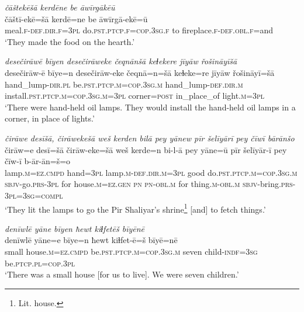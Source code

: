 \ea \label{ŽE.39}
\textit{čāštekēšā kerdēne be āwīrgākēū} \\ 
\gll čāštī-ekē=šā kerdē=ne be āwīrgā-ekē=ū \\ 
 meal\textsc{.f}\textsc{-def}\textsc{.dir}\textsc{.f}\textsc{=3pl} do\textsc{.pst}\textsc{.ptcp}\textsc{.f}\textsc{=cop}\textsc{.3sg}\textsc{.f} to fireplace\textsc{.f}\textsc{-def}\textsc{.obl}\textsc{.f}=and \\ 
\glt `They made the food on the hearth.'
\z 
 
\ea \label{ŽE.41}
\textit{desečirāwē bīyen desečirāweke čeqnānšā keɫekere jīyāw řošināyīšā} \\ 
\gll desečirāw-ē bīye=n desečirāw-eke čeqnā=n=šā keɫeke=re jīyāw řošināyī=šā \\ 
 hand\_lump\textsc{-dir}\textsc{.pl} be\textsc{.pst}\textsc{.ptcp}\textsc{.m}\textsc{=cop}\textsc{.3sg}\textsc{.m} hand\_lump\textsc{-def}\textsc{.dir}\textsc{.m} install\textsc{.pst}\textsc{.ptcp}\textsc{.m}\textsc{=cop}\textsc{.3sg}\textsc{.m}\textsc{=3pl} corner\textsc{=\textsc{post}} in\_place\_of light\textsc{.m}\textsc{=3pl} \\ 
\glt `There were hand-held oil lamps. They would install the hand-held oil lamps in a corner, in place of lights.'
\z 
 
\ea \label{ŽE.42}
\textit{čirāwe desīšā, čirāwekešā weš kerden bilā pey yānew pīr šelīyārī pey čīwī bārānšo} \\ 
\gll čirāw=e desī=šā čirāw-eke=šā weš kerde=n bi-l-ā pey yāne=ū pīr šelīyār-ī pey čīw-ī b-ār-ān=š=o \\ 
 lamp\textsc{.m}\textsc{=ez}\textsc{.cmpd} hand\textsc{=3pl} lamp\textsc{.m}\textsc{-def}\textsc{.dir}\textsc{.m}\textsc{=3pl} good do\textsc{.pst}\textsc{.ptcp}\textsc{.m}\textsc{=cop}\textsc{.3sg}\textsc{.m} \textsc{sbjv-}go\textsc{.prs}\textsc{-3pl} for house\textsc{.m}\textsc{\textsc{=ez.gen}} \textsc{pn} \textsc{pn}\textsc{-obl}\textsc{.m} for thing\textsc{.m}\textsc{-obl}\textsc{.m} \textsc{sbjv-}bring\textsc{.prs}\textsc{-3pl}\textsc{=3sg}\textsc{=compl} \\ 
\glt `They lit the lamps to go the Pir Shaliyar’s shrine\footnote{Lit. house.} [and] to fetch things.'
\z 
 
\ea \label{ŽE.44}
\textit{denīwlē yāne bīyen ħewt kiɫfetēš bīyēnē} \\ 
\gll denīwlē yāne=e bīye=n ħewt kiɫfet-ē=š bīyē=nē \\ 
 small house\textsc{.m}\textsc{=ez}\textsc{.cmpd} be\textsc{.pst}\textsc{.ptcp}\textsc{.m}\textsc{=cop}\textsc{.3sg}\textsc{.m} seven child\textsc{-indf}\textsc{=3sg} be\textsc{.ptcp}\textsc{.pl}\textsc{=cop}\textsc{.3pl} \\ 
\glt `There was a small house [for us to live]. We were seven children.'
\z 
 

